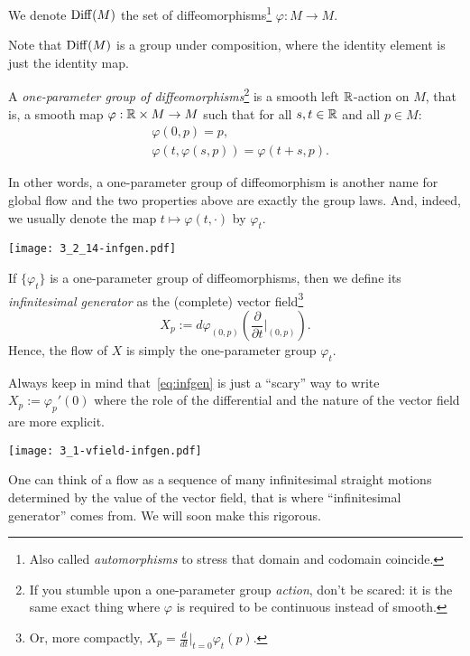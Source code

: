\begin{definition}
  We denote $\operatorname{Diff}(M)$ the set of diffeomorphisms\footnote{Also called \emph{automorphisms} to stress that domain and codomain coincide.} $\varphi: M \to M$.

  Note that $\operatorname{Diff}(M)$ is a group under composition, where the identity element is just the identity map.
\end{definition}

\begin{definition}
  A \emph{one-parameter group of diffeomorphisms}\footnote{If you stumble upon a one-parameter group \emph{action}, don't be scared: it is the same exact thing where $\varphi$ is required to be continuous instead of smooth.} is a smooth left $\mathbb{R}$-action on $M$, that is, a smooth map $\varphi:\mathbb{R}\times M \to M$ such that for all $s,t\in\mathbb{R}$ and all $p\in M$:
  \begin{align}
    &\varphi(0,p) = p,\\
    &\varphi(t, \varphi(s, p)) = \varphi(t+s, p).
  \end{align}
  
  In other words, a one-parameter group of diffeomorphism is another name for global flow and the two properties above are exactly the group laws.
  And, indeed, we usually denote the map $t\mapsto\varphi(t,\cdot)$ by $\varphi_t$.


  \begin{marginfigure}
    \texttt{[image: 3\_2\_14-infgen.pdf]}
  \end{marginfigure}
  If $\{\varphi_t\}$ is a one-parameter group of diffeomorphisms, then we define its \emph{infinitesimal generator} as the (complete) vector field\footnote{Or, more compactly, ${X_p = \frac{d}{dt}\big|_{t=0}\varphi_t(p)}$.}
  \begin{equation}\label{eq:infgen}
    X_p := d\varphi_{(0,p)}\left(\frac{\partial}{\partial t}\Big|_{(0,p)}\right).
  \end{equation}
  Hence, the flow of $X$ is simply the one-parameter group $\varphi_t$.

  Always keep in mind that~\eqref{eq:infgen} is just a ``scary'' way to write $X_p := \varphi_p'(0)$ where the role of the differential and the nature of the vector field are more explicit.
\end{definition}
\begin{marginfigure}
  \texttt{[image: 3\_1-vfield-infgen.pdf]}%
  \caption{One can think of a flow as a sequence of many infinitesimal straight motions determined by the value of the vector field, that is where ``infinitesimal generator'' comes from. We will soon make this rigorous.}%
  \label{fig:3_1-vfield-infgen}
\end{marginfigure}


